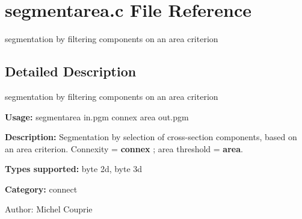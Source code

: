 \section{segmentarea.c File Reference}
\label{segmentarea_8c}
segmentation by filtering components on an area criterion  




\label{_details}
\subsection{Detailed Description}
segmentation by filtering components on an area criterion 

{\bf Usage:} segmentarea in.pgm connex area out.pgm

{\bf Description:} Segmentation by selection of cross-section components, based on an area criterion. Connexity = {\bf connex} ; area threshold = {\bf area}.

{\bf Types supported:} byte 2d, byte 3d

{\bf Category:} connect

\begin{Desc}
\item[Author:]Michel Couprie \end{Desc}
